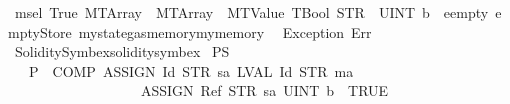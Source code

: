 \begin{isabellebody}
\ {\isachardoublequoteopen}msel\ True\ {\isacharparenleft}{\kern0pt}MTArray\ {}\ {\isacharparenleft}{\kern0pt}MTArray\ {}\ {\isacharparenleft}{\kern0pt}MTValue\ TBool{\isacharparenright}{\kern0pt}{\isacharparenright}{\kern0pt}{\isacharparenright}{\kern0pt}\ {\isacharparenleft}{\kern0pt}STR\ {\isacharprime}{\kern0pt}{\isacharprime}{\kern0pt}{}{\isacharprime}{\kern0pt}{\isacharprime}{\kern0pt}{\isacharparenright}{\kern0pt}\ {\isacharbrackleft}{\kern0pt}UINT\ b{}\ {}{\isacharbrackright}{\kern0pt}\ eempty\ emptyStore\ {\isacharparenleft}{\kern0pt}mystate{\isasymlparr}gas{\isacharcolon}{\kern0pt}{\isacharequal}{\kern0pt}{}{\isacharcomma}{\kern0pt}memory{\isacharcolon}{\kern0pt}{\isacharequal}{\kern0pt}mymemory{}{\isasymrparr}{\isacharparenright}{\kern0pt}\ {}\isanewline
{\isacharequal}{\kern0pt}\ Exception\ {\isacharparenleft}{\kern0pt}Err{\isacharparenright}{\kern0pt}{\isachardoublequoteclose}%
\isadelimproof
\ %
\endisadelimproof
%
\isatagproof
{}\isamarkupfalse%
\ Solidity{\isacharunderscore}{\kern0pt}Symbex{\isachardot}{\kern0pt}solidity{\isacharunderscore}{\kern0pt}symbex%
\endisatagproof
{\isafoldproof}%
%
\isadelimproof
%
\endisadelimproof
%
\isadelimdocument
%
\endisadelimdocument
%
\isatagdocument
%
\isamarkuptrue%
%
\endisatagdocument
{\isafolddocument}%
%
\isadelimdocument
%
\endisadelimdocument
{}\isamarkupfalse%
\ P{}{\isacharcolon}{\kern0pt}{\isacharcolon}{\kern0pt}S\isanewline
\ \ \ {\isachardoublequoteopen}P{}\ {\isasymequiv}\ COMP\ {\isacharparenleft}{\kern0pt}ASSIGN\ {\isacharparenleft}{\kern0pt}Id\ {\isacharparenleft}{\kern0pt}STR\ {\isacharprime}{\kern0pt}{\isacharprime}{\kern0pt}sa{\isacharprime}{\kern0pt}{\isacharprime}{\kern0pt}{\isacharparenright}{\kern0pt}{\isacharparenright}{\kern0pt}\ {\isacharparenleft}{\kern0pt}LVAL\ {\isacharparenleft}{\kern0pt}Id\ {\isacharparenleft}{\kern0pt}STR\ {\isacharprime}{\kern0pt}{\isacharprime}{\kern0pt}ma{\isacharprime}{\kern0pt}{\isacharprime}{\kern0pt}{\isacharparenright}{\kern0pt}{\isacharparenright}{\kern0pt}{\isacharparenright}{\kern0pt}{\isacharparenright}{\kern0pt}\isanewline
\ \ \ \ \ \ \ \ \ \ \ \ \ \ \ \ \ \ \ {\isacharparenleft}{\kern0pt}ASSIGN\ {\isacharparenleft}{\kern0pt}Ref\ {\isacharparenleft}{\kern0pt}STR\ {\isacharprime}{\kern0pt}{\isacharprime}{\kern0pt}sa{\isacharprime}{\kern0pt}{\isacharprime}{\kern0pt}{\isacharparenright}{\kern0pt}\ {\isacharbrackleft}{\kern0pt}UINT\ b{}\ {}{\isacharbrackright}{\kern0pt}{\isacharparenright}{\kern0pt}\ TRUE{\isacharparenright}{\kern0pt}{\isachardoublequoteclose}\isanewline

\end{isabellebody}
